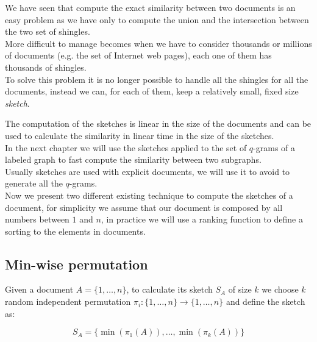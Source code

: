 We have seen that compute the exact similarity between two documents is an easy problem
as we have only to compute the union and the intersection between the two set of shingles.\\

More difficult to manage becomes when we have to consider thousands or millions of documents
(e.g. the set of Internet web pages), each one of them has thousands of shingles.\\

To solve this problem it is no longer possible to handle all the shingles for all the documents, 
instead we can, for each of them, keep a relatively small, fixed size \textit{sketch}\cite{Broder2000}.

The computation of the sketches is linear in the size of the documents and can be used to calculate
the similarity in linear time in the size of the sketches.\\

In the next chapter we will use the sketches applied to the set of $q$-grams of a labeled graph to 
fast compute the similarity between two subgraphs.\\

Usually sketches are used with explicit documents, we will use it to avoid to generate all the $q$-grams.\\

Now we present two different existing technique to compute the sketches of a document, 
for simplicity we assume that our document is composed by all numbers between $1$ and $n$, 
in practice we will use a ranking function to define a sorting to the elements in documents.

\subsection*{Min-wise permutation\cite{Broder:1998:MIP:276698.276781}}

Given a document $A = \{1, \ldots, n\}$, to calculate its sketch $S_{A}$ of size $k$ 
we choose $k$ random independent permutation $\pi_{i} : \{1, \ldots, n\} \rightarrow \{1, \ldots, n\}$ and define the sketch as:

\begin{equation*}
	S_{A} = \{ \min(\pi_{1}(A)), \ldots, \min(\pi_{k}(A)) \}
\end{equation*}

